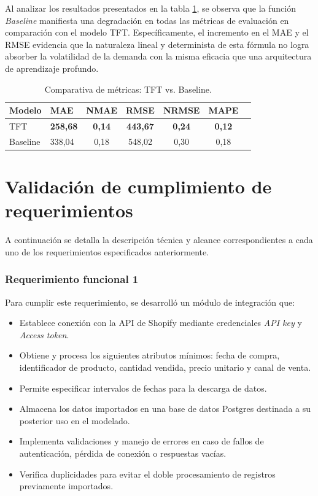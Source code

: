 Al analizar los resultados presentados en la tabla \ref{tab:metricas_modelo_baseline}, se observa que la función \textit{Baseline} manifiesta una degradación en todas las métricas de evaluación en comparación con el modelo TFT. Específicamente, el incremento en el MAE y el RMSE evidencia que la naturaleza lineal y determinista de esta fórmula no logra absorber la volatilidad de la demanda con la misma eficacia que una arquitectura de aprendizaje profundo.


\begin{table}[h]
    \centering
    \caption{Comparativa de métricas: TFT vs. Baseline.}
    \label{tab:metricas_modelo_baseline}
    \begin{tabular}{l l c c c c c}
        \toprule
        \textbf{Modelo} & \textbf{MAE} & \textbf{NMAE} & \textbf{RMSE} & \textbf{NRMSE} & \textbf{MAPE} \\
        \midrule
        TFT & \textbf{258,68} & \textbf{0,14} & \textbf{443,67} & \textbf{0,24} & \textbf{0,12} \\
        Baseline & 338,04 & 0,18 & 548,02 & 0,30 & 0,18 \\
        \bottomrule
    \end{tabular}
\end{table}



\section{Validación de cumplimiento de requerimientos}

A continuación se detalla la descripción técnica y alcance correspondientes a cada uno de los requerimientos especificados anteriormente.


\subsubsection{Requerimiento funcional 1}

Para cumplir este requerimiento, se desarrolló un módulo de integración que:

\begin{itemize}
    \item Establece conexión con la API de Shopify mediante credenciales \textit{API key} y \textit{Access token}.
    \item Obtiene y procesa los siguientes atributos mínimos: fecha de compra, identificador de producto, cantidad vendida, precio unitario y canal de venta.
    \item Permite especificar intervalos de fechas para la descarga de datos.
    \item Almacena los datos importados en una base de datos Postgres destinada a su posterior uso en el modelado.
    \item Implementa validaciones y manejo de errores en caso de fallos de autenticación, pérdida de conexión o respuestas vacías.
    \item Verifica duplicidades para evitar el doble procesamiento de registros previamente importados.
\end{itemize}

